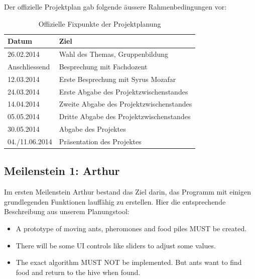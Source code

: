 \noindent
Der offizielle Projektplan gab folgende äussere Rahmenbedingungen vor:


\begin{table}[h]
\small\sffamily\renewcommand{\arraystretch}{1.5}
\begin{tabular}{| p{2.5cm} | l |}
  \hline
  \bfseries{Datum} & \bfseries{Ziel}  \\
  \hline
  26.02.2014 & Wahl des Themas, Gruppenbildung \\ 
  \hline
  Anschliessend & Besprechung mit Fachdozent \\
  \hline
  12.03.2014 & Erste Besprechung mit Syrus Mozafar \\
  \hline
  24.03.2014 & Erste Abgabe des Projektzwischenstandes \\
  \hline
  14.04.2014 & Zweite Abgabe des Projektzwischenstandes \\
  \hline
  05.05.2014 & Dritte Abgabe des Projektzwischenstandes \\
  \hline
  30.05.2014 & Abgabe des Projektes \\
  \hline
  04./11.06.2014 & Präsentation des Projektes \\
  \hline
\end{tabular}
\captionsetup{type=table} %
\caption{Offizielle Fixpunkte der Projektplanung}
\end{table}



\subsection{Meilenstein 1: Arthur}


Im ersten Meilenstein Arthur bestand das Ziel darin, das Programm mit einigen grundlegenden Funktionen lauffähig zu erstellen. Hier die entsprechende Beschreibung aus unserem Planungstool:

\begin{itemize}[noitemsep]
\item A prototype of moving ants, pheromones and food piles MUST be created.
\item There will be some UI controls like sliders to adjust some values.
\item The exact algorithm MUST NOT be implemented. But ants want to find food and return to the hive when found. \\\\
\end{itemize}



